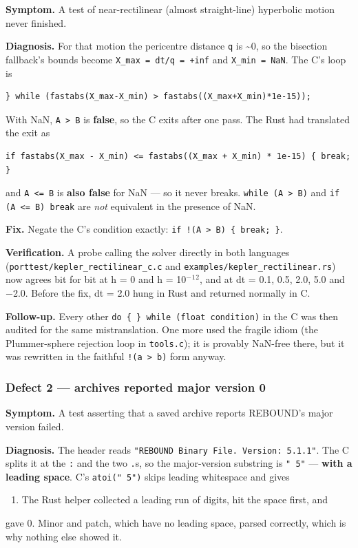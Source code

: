 \documentclass[11pt]{article}
\begin{document}
\textbf{Symptom.} A test of near-rectilinear (almost straight-line) hyperbolic motion never finished.

\textbf{Diagnosis.} For that motion the pericentre distance \texttt{q} is \textasciitilde{}0, so the bisection fallback's bounds become \texttt{X\_max = dt/q = +inf} and \texttt{X\_min = NaN}. The C's loop is

\begin{lstlisting}
} while (fastabs(X_max-X_min) > fastabs((X_max+X_min)*1e-15));
\end{lstlisting}

With NaN, \texttt{A > B} is \textbf{false}, so the C exits after one pass. The Rust had translated the exit as

\begin{lstlisting}
if fastabs(X_max - X_min) <= fastabs((X_max + X_min) * 1e-15) { break; }
\end{lstlisting}

and \texttt{A <= B} is \textbf{also false} for NaN --- so it never breaks. \texttt{while (A > B)} and \texttt{if (A <= B) break} are \emph{not} equivalent in the presence of NaN.

\textbf{Fix.} Negate the C's condition exactly: \texttt{if !(A > B) \{ break; \}}.

\textbf{Verification.} A probe calling the solver directly in both languages (\texttt{porttest/kepler\_rectilinear\_c.c} and \texttt{examples/kepler\_rectilinear.rs}) now agrees bit for bit at h = 0 and h = 10\(^{-}\)\(^{1}\)\(^{2}\), and at dt = 0.1, 0.5, 2.0, 5.0 and \(-\)2.0. Before the fix, dt = 2.0 hung in Rust and returned normally in C.

\textbf{Follow-up.} Every other \texttt{do \{ \} while (float condition)} in the C was then audited for the same mistranslation. One more used the fragile idiom (the Plummer-sphere rejection loop in \texttt{tools.c}); it is provably NaN-free there, but it was rewritten in the faithful \texttt{!(a > b)} form anyway.

\subsubsection{Defect 2 --- archives reported major version 0}

\textbf{Symptom.} A test asserting that a saved archive reports REBOUND's major version failed.

\textbf{Diagnosis.} The header reads \texttt{"REBOUND Binary File. Version: 5.1.1"}. The C splits it at the \texttt{:} and the two \texttt{.}s, so the major-version substring is \texttt{" 5"} --- \textbf{with a leading space}. C's \texttt{atoi(" 5")} skips leading whitespace and gives
\begin{enumerate}
\item The Rust helper collected a leading run of digits, hit the space first, and
\end{enumerate}
gave 0. Minor and patch, which have no leading space, parsed correctly, which is why nothing else showed it.
\end{document}
